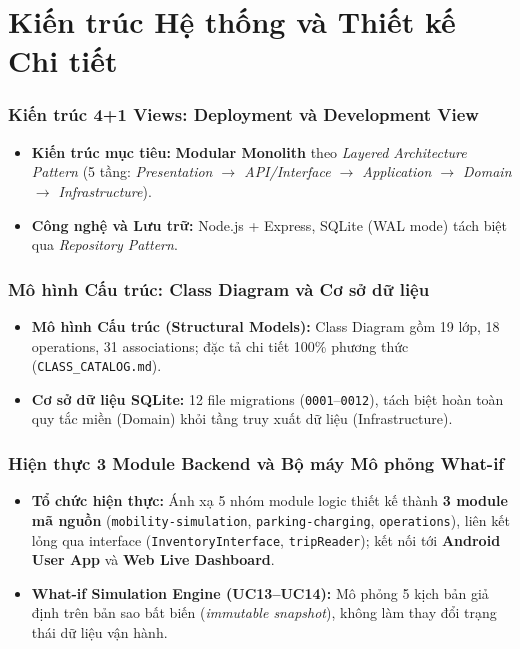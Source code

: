 \section{Kiến trúc Hệ thống và Thiết kế Chi tiết}

\begin{frame}
\frametitle{Kiến trúc 4+1 Views: Deployment và Development View}
\begin{itemize}
    \item \textbf{Kiến trúc mục tiêu:} \textbf{Modular Monolith} theo \textit{Layered Architecture Pattern} (5 tầng: \textit{Presentation $\rightarrow$ API/Interface $\rightarrow$ Application $\rightarrow$ Domain $\rightarrow$ Infrastructure}).
    \item \textbf{Công nghệ và Lưu trữ:} Node.js + Express, SQLite (WAL mode) tách biệt qua \textit{Repository Pattern}.
\end{itemize}
\end{frame}

\begin{frame}
\frametitle{Mô hình Cấu trúc: Class Diagram và Cơ sở dữ liệu}
\begin{itemize}
    \item \textbf{Mô hình Cấu trúc (Structural Models):} Class Diagram gồm 19 lớp, 18 operations, 31 associations; đặc tả chi tiết 100\% phương thức (\texttt{CLASS\_CATALOG.md}).
    \item \textbf{Cơ sở dữ liệu SQLite:} 12 file migrations (\texttt{0001}--\texttt{0012}), tách biệt hoàn toàn quy tắc miền (Domain) khỏi tầng truy xuất dữ liệu (Infrastructure).
\end{itemize}
\end{frame}

\begin{frame}
\frametitle{Hiện thực 3 Module Backend và Bộ máy Mô phỏng What-if}
\begin{itemize}
    \item \textbf{Tổ chức hiện thực:} Ánh xạ 5 nhóm module logic thiết kế thành \textbf{3 module mã nguồn} (\texttt{mobility-simulation}, \texttt{parking-charging}, \texttt{operations}), liên kết lỏng qua interface (\texttt{InventoryInterface}, \texttt{tripReader}); kết nối tới \textbf{Android User App} và \textbf{Web Live Dashboard}.
    \item \textbf{What-if Simulation Engine (UC13--UC14):} Mô phỏng 5 kịch bản giả định trên bản sao bất biến (\textit{immutable snapshot}), không làm thay đổi trạng thái dữ liệu vận hành.
\end{itemize}
\end{frame}
